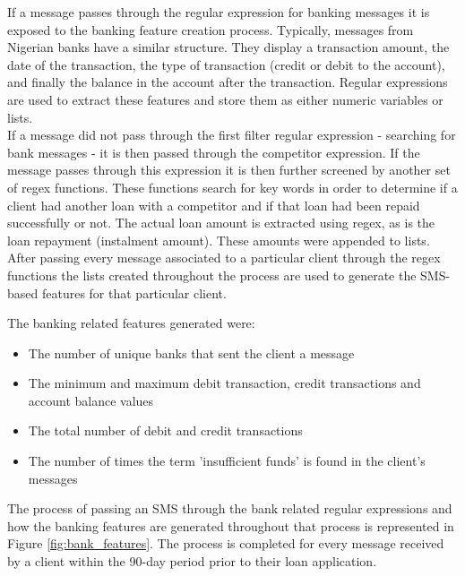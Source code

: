 If a message passes through the regular expression for banking messages it is exposed to the banking feature creation process. Typically, messages from Nigerian banks have a similar structure. They display a transaction amount, the date of the transaction, the type of transaction (credit or debit to the account), and finally the balance in the account after the transaction. Regular expressions are used to extract these features and store them as either numeric variables or lists.  \\

If a message did not pass through the first filter regular expression - searching for bank messages - it is then passed through the competitor expression. If the message passes through this expression it is then further screened by another set of regex functions. These functions search for key words in order to determine if a client had another loan with a competitor and if that loan had been repaid successfully or not. The actual loan amount is extracted using regex, as is the loan repayment (instalment amount). These amounts were appended to lists. \\

After passing every message associated to a particular client through the regex functions the lists created throughout the process are used to generate the SMS-based features for that particular client. \\

\vspace{10pt}

The banking related features generated were:

\begin{itemize}
    \item The number of unique banks that sent the client a message
    \item The minimum and maximum debit transaction, credit transactions and account balance values 
    \item The total number of debit and credit transactions 
    \item The number of times the term 'insufficient funds' is found in the client's messages
\end{itemize}

\vspace{10pt}

The process of passing an SMS through the bank related regular expressions and how the banking features are generated throughout that process is represented in Figure \ref{fig:bank_features}. The process is completed for every message received by a client within the 90-day period prior to their loan application. 

